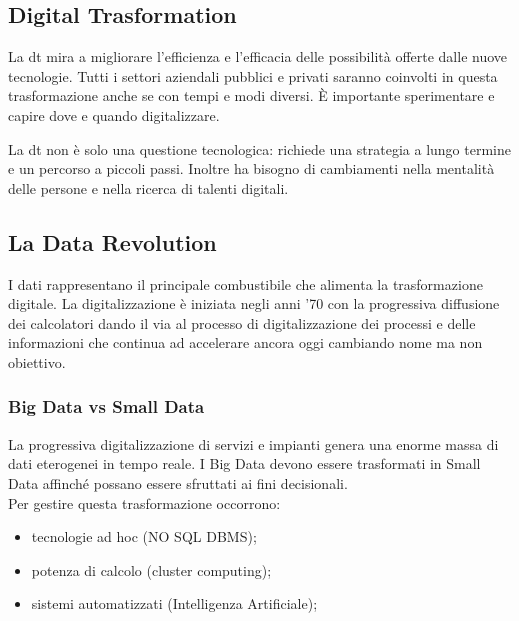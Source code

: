 \subsection{Digital Trasformation}\label{sub:digital_trasformation} %
La \ac{dt} mira a migliorare l'efficienza e l'efficacia delle possibilità offerte dalle nuove tecnologie.
Tutti i settori aziendali pubblici e privati saranno coinvolti in questa trasformazione anche se con tempi e modi diversi.
È importante sperimentare e capire dove e quando digitalizzare.
\begin{note}
    La \ac{dt} non è solo una questione tecnologica: richiede una strategia a lungo termine e un percorso a piccoli passi.
    Inoltre ha bisogno di cambiamenti nella mentalità delle persone e nella ricerca di talenti digitali.
\end{note}
%
\subsection{La Data Revolution}\label{sub:la_data_revolution} %
I dati rappresentano il principale combustibile che alimenta la trasformazione digitale.
La digitalizzazione è iniziata negli anni '70 con la progressiva diffusione dei calcolatori dando il via al processo di digitalizzazione dei processi e delle informazioni che continua ad accelerare ancora oggi cambiando nome ma non obiettivo.
%
\subsubsection{Big Data vs Small Data}\label{sub:big_data_vs_small_data} %
La progressiva digitalizzazione di servizi e impianti genera una enorme massa di dati eterogenei in tempo reale.
I Big Data devono essere trasformati in Small Data affinché possano essere sfruttati ai fini decisionali.
\\
Per gestire questa trasformazione occorrono:
\begin{itemize}
    \item tecnologie ad hoc (NO SQL DBMS);
    \item potenza di calcolo (cluster computing);
    \item sistemi automatizzati (Intelligenza Artificiale);
\end{itemize}
%
